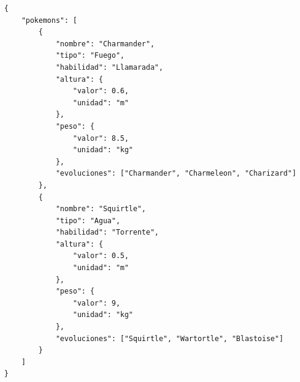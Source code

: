 \documentclass[
    12pt,
    a4paper,
    addpoints,
    answers,
    convocatoria=ord,
    titulacion=NoCD,
    curso=2023/2024,
]{db-exam}
\begin{document}
\begin{questions}
\begin{solution}
\begin{verbatim}
{
    "pokemons": [
        {
            "nombre": "Charmander",
            "tipo": "Fuego",
            "habilidad": "Llamarada",
            "altura": {
                "valor": 0.6,
                "unidad": "m"
            },
            "peso": {
                "valor": 8.5,
                "unidad": "kg"
            },
            "evoluciones": ["Charmander", "Charmeleon", "Charizard"]
        },
        {
            "nombre": "Squirtle",
            "tipo": "Agua",
            "habilidad": "Torrente",
            "altura": {
                "valor": 0.5,
                "unidad": "m"
            },
            "peso": {
                "valor": 9,
                "unidad": "kg"
            },
            "evoluciones": ["Squirtle", "Wartortle", "Blastoise"]
        }
    ]
}
\end{verbatim}
\end{solution}
\end{questions}
\end{document}
